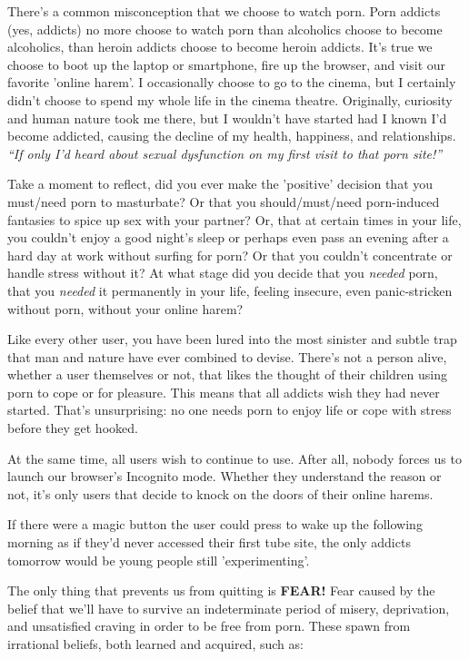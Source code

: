 \documentclass[
]{book}
\begin{document}
There's a common misconception that we choose to watch porn. Porn addicts (yes, addicts) no more choose to watch porn than alcoholics choose to become alcoholics, than heroin addicts choose to become heroin addicts. It's true we choose to boot up the laptop or smartphone, fire up the browser, and visit our favorite 'online harem'. I occasionally choose to go to the cinema, but I certainly didn't choose to spend my whole life in the cinema theatre. Originally, curiosity and human nature took me there, but I wouldn't have started had I known I'd become addicted, causing the decline of my health, happiness, and relationships. \emph{``If only I'd heard about sexual dysfunction on my first visit to that porn site!''}

Take a moment to reflect, did you ever make the 'positive' decision that you must/need porn to masturbate? Or that you should/must/need porn-induced fantasies to spice up sex with your partner? Or, that at certain times in your life, you couldn't enjoy a good night's sleep or perhaps even pass an evening after a hard day at work without surfing for porn? Or that you couldn't concentrate or handle stress without it? At what stage did you decide that you \emph{needed} porn, that you \emph{needed} it permanently in your life, feeling insecure, even panic-stricken without porn, without your online harem?

Like every other user, you have been lured into the most sinister and subtle trap that man and nature have ever combined to devise. There's not a person alive, whether a user themselves or not, that likes the thought of their children using porn to cope or for pleasure. This means that all addicts wish they had never started. That's unsurprising: no one needs porn to enjoy life or cope with stress before they get hooked.

At the same time, all users wish to continue to use. After all, nobody forces us to launch our browser's Incognito mode. Whether they understand the reason or not, it's only users that decide to knock on the doors of their online harems.

If there were a magic button the user could press to wake up the following morning as if they'd never accessed their first tube site, the only addicts tomorrow would be young people still 'experimenting'.

The only thing that prevents us from quitting is \textbf{FEAR!} Fear caused by the belief that we'll have to survive an indeterminate period of misery, deprivation, and unsatisfied craving in order to be free from porn. These spawn from irrational beliefs, both learned and acquired, such as:
\end{document}

